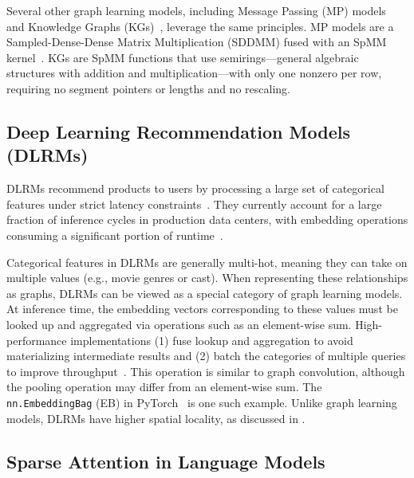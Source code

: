 Several other graph learning models, including Message Passing (MP) models~\cite{rahman2021ipdps} and Knowledge Graphs (KGs)~\cite{bernerslee2001semantic}, leverage the same principles. MP models are a Sampled-Dense-Dense Matrix Multiplication (SDDMM) fused with an SpMM kernel~\cite{rahman2021ipdps}. KGs are SpMM functions that use semirings---general algebraic structures with addition and multiplication---with only one nonzero per row, requiring no segment pointers or lengths and no rescaling.

\subsection{Deep Learning Recommendation Models (DLRMs)} \label{sec:background-dlrms}  %

DLRMs recommend products to users by processing a large set of categorical features under strict latency constraints~\cite{gupta2020hpca,ibrahim2022memsys,gupta2020isca}. They currently account for a large fraction of inference cycles in production data centers, with embedding operations consuming a significant portion of runtime~\cite{gupta2020hpca,gupta2020isca}.

Categorical features in DLRMs are generally multi-hot, meaning they can take on multiple values (e.g., movie genres or cast). When representing these relationships as graphs, DLRMs can be viewed as a special category of graph learning models. At inference time, the embedding vectors corresponding to these values must be looked up and aggregated via operations such as an element-wise sum. High-performance implementations (1) fuse lookup and aggregation to avoid materializing intermediate results and (2) batch the categories of multiple queries to improve throughput~\cite{mudigere2022isca}. This operation is similar to graph convolution, although the pooling operation may differ from an element-wise sum. The \texttt{nn.EmbeddingBag} (EB) in PyTorch~\cite{paszke2019neurips} is one such example. Unlike graph learning models, DLRMs have higher spatial locality, as discussed in .

\subsection{Sparse Attention in Language Models} \label{sec:background-llms} %

